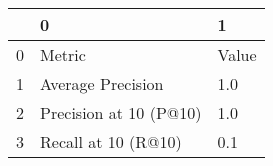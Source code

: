 \begin{tabular}{lll}
\toprule
{} &                       0 &      1 \\
\midrule
0 &                  Metric &  Value \\
1 &       Average Precision &    1.0 \\
2 &  Precision at 10 (P@10) &    1.0 \\
3 &     Recall at 10 (R@10) &    0.1 \\
\bottomrule
\end{tabular}
